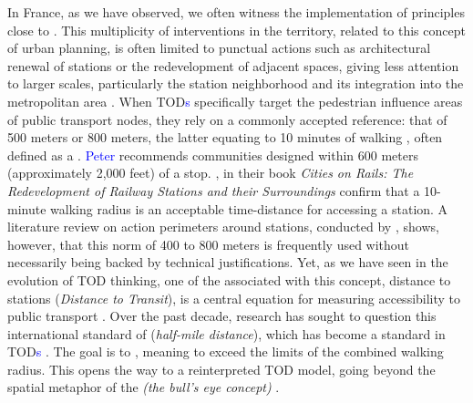 \begin{refsegment}
In France, as we have observed, we often witness the implementation of principles close to  \textcolor{blue}{\autocite[273]{lo_feudo_scenario_2014}}. This multiplicity of interventions in the territory, related to this concept of urban planning, is often limited to punctual actions such as architectural renewal of stations or the redevelopment of adjacent spaces, giving less attention to larger scales, particularly the station neighborhood and its integration into the metropolitan area \textcolor{blue}{\autocite[50]{bentayou_transit-oriented_2015}}. When \acrshort{TOD}\textcolor{blue}{s} specifically target the pedestrian influence areas of public transport nodes, they rely on a commonly accepted reference: that of 500 meters or 800 meters, the latter equating to 10 minutes of walking \textcolor{blue}{\autocite[1]{lhostis_perimetres_2016}}, often defined as a . \textcolor{blue}{Peter} \textcolor{blue}{\textcite[56]{calthorpe_next_1993}} recommends communities designed within 600 meters (approximately 2,000 feet) of a stop. \textcolor{blue}{\textcite[12]{bertolini_cities_2015}}, in their book \foreignlanguage{english}{\textsl{Cities on Rails: The Redevelopment of Railway Stations and their Surroundings}} confirm that a 10-minute walking radius is an acceptable time-distance for accessing a station. A literature review on action perimeters around stations, conducted by \textcolor{blue}{\textcite[102]{guerra_half-mile_2012}}, shows, however, that this norm of 400 to 800 meters is frequently used without necessarily being backed by technical justifications. Yet, as we have seen in the evolution of \acrshort{TOD} thinking, one of the  associated with this concept, distance to stations (\textsl{Distance to Transit}), is a central equation for measuring accessibility to public transport \textcolor{blue}{\autocite[267]{ewing_travel_2010}}. Over the past decade, research has sought to question this international standard of  (\textsl{half-mile distance}), which has become a standard in \acrshort{TOD}\textcolor{blue}{s} \textcolor{blue}{\autocite[102]{guerra_half-mile_2012}}. The goal is to  \textcolor{blue}{\autocite[33]{guerra_half-mile_2012}}, meaning to exceed the limits of the combined walking radius. This opens the way to a reinterpreted \acrshort{TOD} model, going beyond the spatial metaphor of the  \textsl{(the bull’s eye concept)} \textcolor{blue}{\autocite[28]{curtis_transit_2009}}.%


\end{refsegment}
